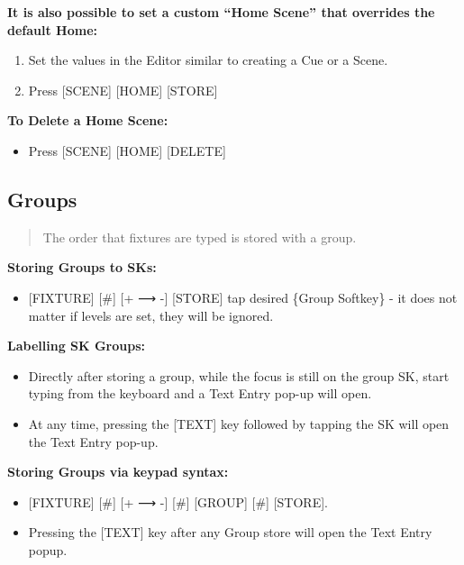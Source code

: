 \documentclass[
]{article}
\providecommand{\tightlist}{%
  \setlength{\itemsep}{0pt}\setlength{\parskip}{0pt}}
\begin{document}
\textbf{It is also possible to set a custom ``Home Scene'' that overrides the default Home:}

\begin{enumerate}
\def\labelenumi{\arabic{enumi}.}
\item
  Set the values in the Editor similar to creating a Cue or a Scene.
\item
  Press {[}SCENE{]} {[}HOME{]} {[}STORE{]}
\end{enumerate}

\textbf{To Delete a Home Scene:}

\begin{itemize}
\tightlist
\item
  Press {[}SCENE{]} {[}HOME{]} {[}DELETE{]}
\end{itemize}

\hypertarget{groups}{%
\subsection{Groups}\label{groups}}

\begin{quote}
{The order that fixtures are typed is stored with a group}.
\end{quote}

\textbf{Storing Groups to SKs:}

\begin{itemize}
\tightlist
\item
  {[}FIXTURE{]} {[}\#{]} {[}+ ⟶ -{]} {[}STORE{]} tap desired \{Group Softkey\} - it does not matter if levels are set, they will be ignored.
\end{itemize}

\textbf{Labelling SK Groups:}

\begin{itemize}
\item
  Directly after storing a group, while the focus is still on the group SK, start typing from the keyboard and a Text Entry pop-up will open.
\item
  At any time, pressing the {[}TEXT{]} key followed by tapping the SK will open the Text Entry pop-up.
\end{itemize}

\textbf{Storing Groups via keypad syntax:}

\begin{itemize}
\item
  {[}FIXTURE{]} {[}\#{]} {[}+ ⟶ -{]} {[}\#{]} {[}GROUP{]} {[}\#{]} {[}STORE{]}.
\item
  Pressing the {[}TEXT{]} key after any Group store will open the Text Entry popup.
\end{itemize}
\end{document}
